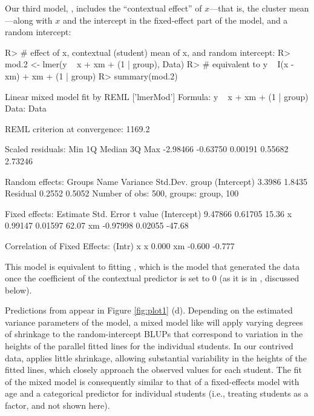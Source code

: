 \documentclass[
]{jss}
\begin{document}
Our third model, , includes the ``contextual effect'' of
\(x\)---that is, the cluster mean ---along with \(x\) and the
intercept in the fixed-effect part of the model, and a random intercept:

\begin{CodeChunk}
\begin{CodeInput}
R> # effect of x, contextual (student) mean of x, and random intercept:
R> mod.2 <- lmer(y ~ x + xm + (1 | group), Data)
R>         # equivalent to y ~ I(x - xm) + xm + (1 | group)
R> summary(mod.2)
\end{CodeInput}
\begin{CodeOutput}
Linear mixed model fit by REML ['lmerMod']
Formula: y ~ x + xm + (1 | group)
   Data: Data

REML criterion at convergence: 1169.2

Scaled residuals: 
     Min       1Q   Median       3Q      Max 
-2.98466 -0.63750  0.00191  0.55682  2.73246 

Random effects:
 Groups   Name        Variance Std.Dev.
 group    (Intercept) 3.3986   1.8435  
 Residual             0.2552   0.5052  
Number of obs: 500, groups:  group, 100

Fixed effects:
            Estimate Std. Error t value
(Intercept)  9.47866    0.61705   15.36
x            0.99147    0.01597   62.07
xm          -0.97998    0.02055  -47.68

Correlation of Fixed Effects:
   (Intr) x     
x   0.000       
xm -0.600 -0.777
\end{CodeOutput}
\end{CodeChunk}

This model is equivalent to fitting
, which is the model that
generated the data once the coefficient of the contextual predictor
 is set to 0 (as it is in , discussed below).

Predictions from  appear in Figure \ref{fig:plot1} (d).
Depending on the estimated variance parameters of the model, a mixed
model like  will apply varying degrees of shrinkage to the
random-intercept BLUPs that correspond to variation in the heights of
the parallel fitted lines for the individual students. In our contrived
data,  applies little shrinkage, allowing substantial
variability in the heights of the fitted lines, which closely approach
the observed values for each student. The fit of the mixed model
 is consequently similar to that of a fixed-effects model
with age and a categorical predictor for individual students (i.e.,
treating students as a factor, and not shown here).
\end{document}
